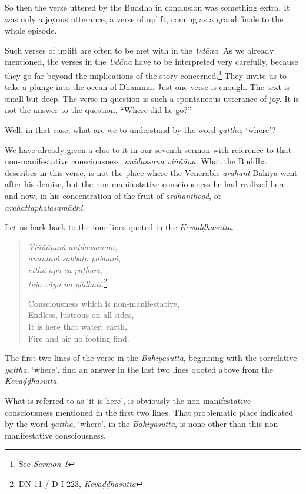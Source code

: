 So then the verse uttered by the Buddha in conclusion was something extra. It was only a joyous utterance, a verse of uplift, coming as a grand finale to the whole episode.

Such verses of uplift are often to be met with in the \emph{Udāna}. As we already mentioned, the verses in the \emph{Udāna} have to be interpreted very carefully, because they go far beyond the implications of the story concerned.\footnote{See \emph{Sermon 1}} They invite us to take a plunge into the ocean of Dhamma. Just one verse is enough. The text is small but deep. The verse in question is such a spontaneous utterance of joy. It is not the answer to the question, ``Where did he go?''

Well, in that case, what are we to understand by the word \emph{yattha}, `where'?

We have already given a clue to it in our seventh sermon with reference to that non-manifestative consciousness, \emph{anidassana viññāṇa}. What the Buddha describes in this verse, is not the place where the Venerable \emph{arahant} Bāhiya went after his demise, but the non-manifestative consciousness he had realized here and now, in his concentration of the fruit of \emph{arahanthood}, or \emph{arahattaphalasamādhi}.

Let us hark back to the four lines quoted in the \emph{Kevaḍḍhasutta}.

\clearpage

\begin{quote}
\emph{Viññāṇaṁ anidassanaṁ,}\\
\emph{anantaṁ sabbato pabhaṁ,}\\
\emph{ettha āpo ca paṭhavī,}\\
\emph{tejo vāyo na gādhati.}\footnote{\href{https://suttacentral.net/dn11/pli/ms}{DN 11 / D I 223}, \emph{Kevaḍḍhasutta}}

Consciousness which is non-manifestative,\\
Endless, lustrous on all sides,\\
It is here that water, earth,\\
Fire and air no footing find.
\end{quote}

The first two lines of the verse in the \emph{Bāhiyasutta}, beginning with the correlative \emph{yattha}, `where', find an answer in the last two lines quoted above from the \emph{Kevaḍḍhasutta}.

What is referred to as `it is here', is obviously the non-manifestative consciousness mentioned in the first two lines. That problematic place indicated by the word \emph{yattha}, `where', in the \emph{Bāhiyasutta}, is none other than this non-manifestative consciousness.

